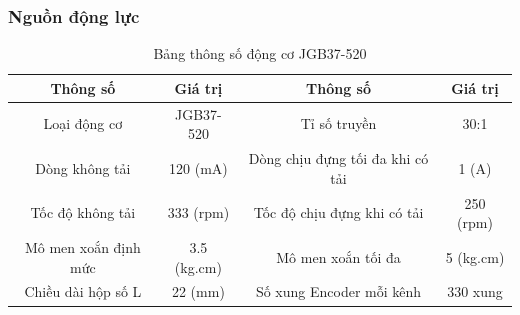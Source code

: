             \subsubsection{Nguồn động lực}
                \begin{table}[H]
                    \centering
                    \caption{Bảng thông số động cơ JGB37-520}
                    \label{tab:4-5}
                    \begin{tabular}{|c|c|c|c|}
                        \hline
                        \textbf{Thông số} & \textbf{Giá trị} & \textbf{Thông số} & \textbf{Giá trị} \\
                        \hline
                        Loại động cơ & JGB37-520 & Tỉ số truyền & 30:1 \\
                        \hline
                        Dòng không tải & 120 (mA) & Dòng chịu đựng tối đa khi có tải & 1 (A) \\
                        \hline
                        Tốc độ không tải & 333 (rpm) & Tốc độ chịu đựng khi có tải & 250 (rpm) \\
                        \hline
                        Mô men xoắn định mức & 3.5 (kg.cm) & Mô men xoắn tối đa & 5 (kg.cm) \\
                        \hline
                        Chiều dài hộp số L & 22 (mm) & Số xung Encoder mỗi kênh & 330 xung \\
                        \hline
                    \end{tabular}
                \end{table}
